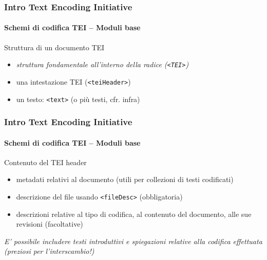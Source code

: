 
       
    
   


\begin{frame}
	\frametitle{Intro Text Encoding Initiative}
	\framesubtitle{Schemi di codifica TEI – Moduli base}
	\addtocounter{nframe}{1}

	\begin{block}{Struttura di un documento TEI}
        \begin{itemize}
            \item \textit{struttura fondamentale all’interno della radice (\texttt{<TEI>})}
            \item una intestazione TEI (\texttt{<teiHeader>})
            \item un testo: \texttt{<text>} (o più testi, cfr. infra)
        \end{itemize}
    \end{block}
    
\end{frame}


\begin{frame}
	\frametitle{Intro Text Encoding Initiative}
	\framesubtitle{Schemi di codifica TEI – Moduli base}
	\addtocounter{nframe}{1}

    \begin{block}{Contenuto del TEI header}
        \begin{itemize}
            \item metadati relativi al documento (utili per collezioni di testi
            codificati)
            \item descrizione del file usando \texttt{<fileDesc>} (obbligatoria)
            \item descrizioni relative al tipo di codifica, al contenuto del
            documento, alle sue revisioni (facoltative)
        \end{itemize}
    \end{block}
\textit{E' possibile includere testi introduttivi e spiegazioni relative alla
codifica effettuata (preziosi per l’interscambio!)}

\end{frame}


